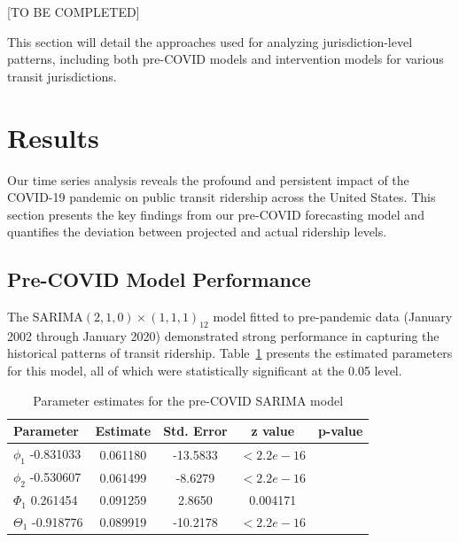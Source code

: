 \documentclass[11pt]{article}
\begin{document}
[TO BE COMPLETED]

This section will detail the approaches used for analyzing jurisdiction-level patterns, including both pre-COVID models and intervention models for various transit jurisdictions.

\section{Results}

Our time series analysis reveals the profound and persistent impact of the COVID-19 pandemic on public transit ridership across the United States. This section presents the key findings from our pre-COVID forecasting model and quantifies the deviation between projected and actual ridership levels.

\subsection{Pre-COVID Model Performance}

The SARIMA$(2,1,0)\times(1,1,1)_{12}$ model fitted to pre-pandemic data (January 2002 through January 2020) demonstrated strong performance in capturing the historical patterns of transit ridership. Table~\ref{t:model_params} presents the estimated parameters for this model, all of which were statistically significant at the 0.05 level.

\begin{table}[!ht]
\caption{Parameter estimates for the pre-COVID SARIMA model}
\label{t:model_params}
\begin{center}
\begin{tabular}{lcccc}
\hline
Parameter & Estimate & Std. Error & z value & p-value \\
\hline
$\phi_1$   -0.831033 &  0.061180 & -13.5833 & $< 2.2e-16$ \\
$\phi_2$   -0.530607 &  0.061499 &  -8.6279 & $< 2.2e-16$ \\
$\Phi_1$    0.261454 &  0.091259 &   2.8650 &  0.004171   \\
$\Theta_1$ -0.918776 &  0.089919 & -10.2178 & $< 2.2e-16$ \\
\hline
\end{tabular}
\end{center}
\end{table}
\end{document}
